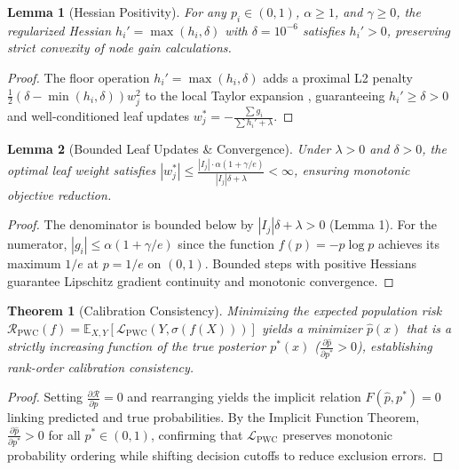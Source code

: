 \documentclass[conference]{IEEEtran}
\begin{document}
\newtheorem{lemma}{Lemma}
\newtheorem{theorem}{Theorem}

\begin{lemma}[Hessian Positivity]
For any $p_i \in (0, 1)$, $\alpha \ge 1$, and $\gamma \ge 0$, the regularized Hessian $h_i' = \max(h_i, \delta)$ with $\delta = 10^{-6}$ satisfies $h_i' > 0$, preserving strict convexity of node gain calculations.
\end{lemma}
\begin{proof}
The floor operation $h_i' = \max(h_i, \delta)$ adds a proximal L2 penalty $\frac{1}{2}(\delta - \min(h_i, \delta)) w_j^2$ to the local Taylor expansion \cite{b20}, guaranteeing $h_i' \ge \delta > 0$ and well-conditioned leaf updates $w_j^* = -\frac{\sum g_i}{\sum h_i' + \lambda}$.
\end{proof}

\begin{lemma}[Bounded Leaf Updates \& Convergence]
Under $\lambda > 0$ and $\delta > 0$, the optimal leaf weight satisfies $|w_j^*| \le \frac{|I_j| \cdot \alpha (1 + \gamma / e)}{|I_j|\delta + \lambda} < \infty$, ensuring monotonic objective reduction.
\end{lemma}
\begin{proof}
The denominator is bounded below by $|I_j|\delta + \lambda > 0$ (Lemma 1). For the numerator, $|g_i| \le \alpha(1 + \gamma/e)$ since the function $f(p)=-p\log p$ achieves its maximum $1/e$ at $p=1/e$ on $(0,1)$. Bounded steps with positive Hessians guarantee Lipschitz gradient continuity and monotonic convergence.
\end{proof}

\begin{theorem}[Calibration Consistency]
Minimizing the expected population risk $\mathcal{R}_{\text{PWC}}(f) = \mathbb{E}_{X,Y}[\mathcal{L}_{\text{PWC}}(Y, \sigma(f(X)))]$ yields a minimizer $\hat{p}(x)$ that is a strictly increasing function of the true posterior $p^*(x)$ ($\frac{\partial \hat{p}}{\partial p^*} > 0$), establishing rank-order calibration consistency.
\end{theorem}
\begin{proof}
Setting $\frac{\partial \mathcal{R}}{\partial \hat{p}} = 0$ and rearranging yields the implicit relation $F(\hat{p}, p^*) = 0$ linking predicted and true probabilities. By the Implicit Function Theorem, $\frac{\partial \hat{p}}{\partial p^*} > 0$ for all $p^* \in (0,1)$, confirming that $\mathcal{L}_{\text{PWC}}$ preserves monotonic probability ordering while shifting decision cutoffs to reduce exclusion errors.
\end{proof}
\end{document}
